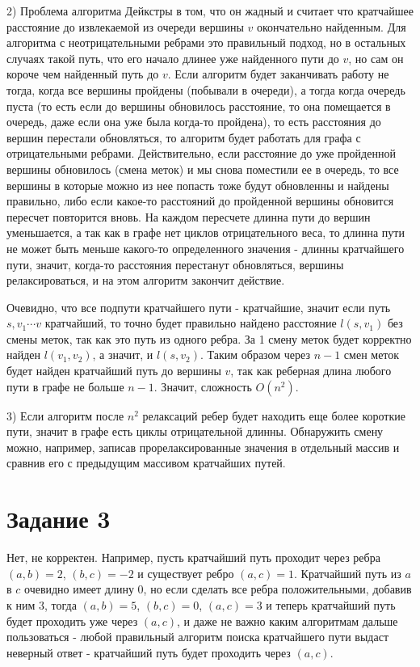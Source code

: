 \documentclass[a4paper,12pt]{article}
\begin{document}
2) Проблема алгоритма Дейкстры в том, что он жадный и считает что кратчайшее расстояние до извлекаемой из очереди вершины $v$ окончательно найденным. Для алгоритма с неотрицательными ребрами это правильный подход, но в остальных случаях такой путь, что его начало длинее уже найденного пути до $v$, но сам он короче чем найденный путь до $v$. Если алгоритм будет заканчивать работу не тогда, когда все вершины пройдены (побывали в очереди), а тогда когда очередь пуста (то есть если до вершины обновилось расстояние, то она помещается в очередь, даже если она уже была когда-то пройдена), то есть расстояния до вершин перестали обновляться, то алгоритм будет работать для графа с отрицательными ребрами. Действительно, если расстояние до уже пройденной вершины обновилось (смена меток) и мы снова поместили ее в очередь, то все вершины в которые можно из нее попасть тоже будут обновленны и найдены правильно, либо если какое-то расстояний до пройденной вершины обновится пересчет повторится вновь. На каждом пересчете длинна пути до вершин уменьшается, а так как в графе нет циклов отрицательного веса, то длинна пути не может быть меньше какого-то определенного значения - длинны кратчайшего пути, значит, когда-то расстояния перестанут обновляться, вершины релаксироваться, и на этом алгоритм закончит действие. 

Очевидно, что все подпути кратчайшего пути - кратчайшие, значит если путь $s,v_{1}\cdots v$ кратчайший, то точно будет правильно найдено расстояние $l(s,v_{1})$ без смены меток, так как это путь из одного ребра. За 1 смену меток будет корректно найден $l(v_{1},v_{2})$, а значит, и $l(s,v_{2})$. Таким образом через $n-1$ смен меток будет найден кратчайший путь до вершины $v$, так как реберная длина любого пути в графе не больше $n-1$. Значит, сложность $O(n^2)$.

3) Если алгоритм после $n^2$ релаксаций ребер будет находить еще более короткие пути, значит в графе есть циклы отрицательной длинны. Обнаружить смену можно, например, записав прорелаксированные значения в отдельный массив и сравнив его с предыдущим массивом кратчайших путей.



\section*{Задание 3}
\hspace{0.5cm}
Нет, не корректен. Например, пусть кратчайший путь проходит через ребра $(a,b)=2$, $(b,c)=-2$ и существует ребро $(a,c)=1$. Кратчайший путь из $a$ в $c$ очевидно имеет длину $0$, но если сделать все ребра положительными, добавив к ним $3$, тогда $(a,b)=5$, $(b,c)=0$, $(a,c)=3$ и теперь кратчайший путь будет проходить уже через $(a,c)$, и даже не важно каким алгоритмам дальше пользоваться - любой правильный алгоритм поиска кратчайшего пути выдаст неверный ответ - кратчайший путь будет проходить через $(a,c)$.
\end{document}
